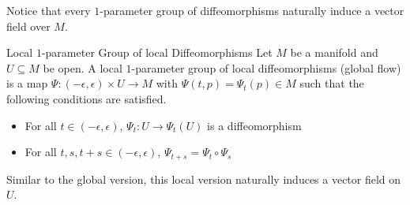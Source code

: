 \documentclass[a4paper]{article}
\begin{document}
Notice that every $1$-parameter group of diffeomorphisms naturally induce a vector field over $M$. 

\begin{defn}{Local $1$-parameter Group of local Diffeomorphisms}{} Let $M$ be a manifold and $U\subseteq M$ be open. A local $1$-parameter group of local diffeomorphisms (global flow) is a map $\Psi:(-\epsilon,\epsilon)\times U\to M$ with $\Psi(t,p)=\Psi_t(p)\in M$ such that the following conditions are satisfied. 
\begin{itemize}
\item For all $t\in(-\epsilon,\epsilon)$, $\Psi_t:U\to\Psi_t(U)$ is a diffeomorphism
\item For all $t,s,t+s\in(-\epsilon,\epsilon)$, $\Psi_{t+s}=\Psi_t\circ\Psi_s$
\end{itemize}
\end{defn}

Similar to the global version, this local version naturally induces a vector field on $U$. 
\end{document}
